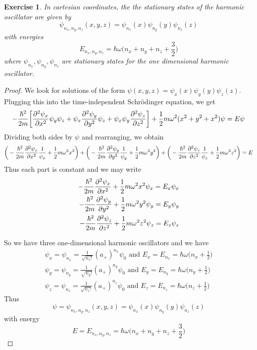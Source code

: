 \documentclass[12pt]{amsart}
\newtheorem{ex}[thm]{Exercise}
\newcommand{\sch}{Schr\"{o}dinger }
\newcommand{\om}{\omega}
\begin{document}
\begin{ex}
	In cartesian coordinates, the the stationary states of the harmonic oscillator are given by $$\psi_{n_x, n_y, n_z}(x,y,z) = \psi_{n_x}(x)\psi_{n_y}(y)\psi_{n_z}(z)$$ with energies $$E_{n_x,n_y, n_z} = \hbar \om \bigg (n_x + n_y + n_z + \frac{3}{2} \bigg)$$ where $\psi_{n_x}, \psi_{n_y}, \psi_{n_z}$ are stationary states for the one dimensional harmonic oscillator.
\end{ex}

\begin{proof}
	We look for solutions of the form $\psi(x,y,z) = \psi_x(x) \psi_y(y) \psi_z(z)$. Plugging this into the time-independent \sch equation, we get $$-\frac{\hbar^2}{2m}\bigg[ \pdv[2]{\psi_x}{x}\psi_y \psi_z + \psi_x \pdv[2]{\psi_y}{y} \psi_z  + \psi_x \psi_y \pdv[2]{\psi_z}{z} \bigg] + \frac{1}{2}m \omega^2(x^2 + y^2 + x^2) \psi = E\psi$$ Dividing both sides by $\psi$ and rearranging, we obtain $$\bigg(-\frac{\hbar^2}{2m}\pdv[2]{\psi_x}{x}\frac{1}{\psi_x} + \frac{1}{2}m \om^2x^2\bigg) + \bigg(-\frac{\hbar^2}{2m}\pdv[2]{\psi_y}{y}\frac{1}{\psi_y} + \frac{1}{2}m \om^2y^2\bigg)+ \bigg(-\frac{\hbar^2}{2m}\pdv[2]{\psi_z}{z}\frac{1}{\psi_z} + \frac{1}{2}m \om^2z^2\bigg) = E $$ 
	Thus each part is constant and we may write 
	\begin{align*}
		-\frac{\hbar^2}{2m}\pdv[2]{\psi_x}{x} + \frac{1}{2}m \om^2x^2\psi_x = E_x\psi_x \\ 
		-\frac{\hbar^2}{2m}\pdv[2]{\psi_y}{y} + \frac{1}{2}m \om^2y^2\psi_y = E_y\psi_y \\
		-\frac{\hbar^2}{2m}\pdv[2]{\psi_z}{z} + \frac{1}{2}m \om^2z^2\psi_z = E_z\psi_z
	\end{align*}
	
	So we have three one-dimensional harmonic oscillators and we have 
	\begin{align*}
		\psi_x = \psi_{n_x} = \frac{1}{\sqrt{{n_x}!}}(a_+)^{n_x} \psi_0 \text{ and } E_x = E_{n_x} = \hbar \om \bigg( n_x +\frac{1}{2}\bigg)\\
		\psi_y = \psi_{n_y} = \frac{1}{\sqrt{{n_y}!}}(a_+)^{n_y} \psi_0 \text{ and } E_y = E_{n_y} = \hbar \om \bigg( n_y +\frac{1}{2}\bigg)\\
		\psi_z = \psi_{n_z} = \frac{1}{\sqrt{{n_z}!}}(a_+)^{n_z} \psi_0 \text{ and } E_z = E_{n_z} = \hbar \om \bigg( n_z +\frac{1}{2}\bigg)
	\end{align*}
	Thus $$\psi = \psi_{n_x, n_y, n_z}(x,y,z) = \psi_{n_x}(x)\psi_{n_y}(y)\psi_{n_z}(z)$$ with energy $$E = E_{n_x,n_y, n_z} = \hbar \om \bigg (n_x + n_y + n_z + \frac{3}{2} \bigg)$$
\end{proof}
\end{document}
